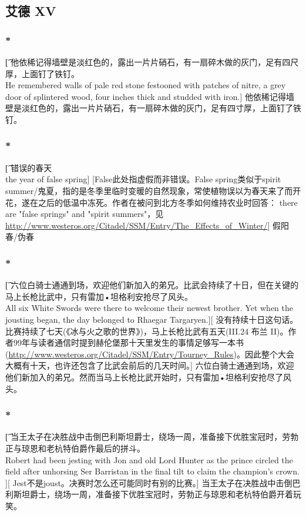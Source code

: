 \documentclass[12pt,a4paper]{article}
\begin{document}
\subsection{艾德 XV}
\subsubsection{\color{red}*}\t[	
	他依稀记得墙壁是淡红色的，露出一片片硝石，有一扇碎木做的灰门，足有四尺厚，上面钉了铁钉。\\
	He remembered walls of pale red stone festooned with patches of nitre, a grey door of splintered wood, four inches thick and studded with iron.]
	他依稀记得墙壁是淡红色的，露出一片片硝石，有一扇碎木做的灰门，足有四寸厚，上面钉了铁钉。

\subsubsection{\color{red}*}\label{1.58.2}\t[		
错误的春天\\		
the year of false spring]		
[False此处指虚假而非错误。False spring类似于spirit summer/鬼夏，指的是冬季里临时变暖的自然现象，常使植物误以为春天来了而开花，遂在之后的低温中冻死。作者在被问到北方冬季如何维持农业时回答： there are "false springs" and "spirit summers"，见\url{http://www.westeros.org/Citadel/SSM/Entry/The_Effects_of_Winter/}]		
假阳春/伪春
	
\subsubsection{\color{red}*}\t[	
	六位白骑士通通到场，欢迎他们新加入的弟兄。比武会持续了十日，但在关键的马上长枪比武中，只有雷加•坦格利安抢尽了风头。\\
	All six White Swords were there to welcome their newest brother. Yet when the jousting began, the day belonged to Rhaegar Targaryen.][
	没有持续十日这句话。比赛持续了七天(《冰与火之歌的世界》)，马上长枪比武有五天(III.24 布兰 II)。作者99年与读者通信时提到赫伦堡那十天里发生的事情足够写一本书(\url{http://www.westeros.org/Citadel/SSM/Entry/Tourney_Rules})。因此整个大会大概有十天，也许还包含了比武会前后的几天时间。]
	六位白骑士通通到场，欢迎他们新加入的弟兄。然而当马上长枪比武开始时，只有雷加•坦格利安抢尽了风头。
	
\subsubsection{\color{red}*}\t[	
	当王太子在决胜战中击倒巴利斯坦爵士，绕场一周，准备接下优胜宝冠时，劳勃正与琼恩和老杭特伯爵作最后的拼斗。\\
	Robert had been jesting with Jon and old Lord Hunter as the prince circled the field after unhorsing Ser Barristan in the final tilt to claim the champion's crown. ][
	Jest不是joust。决赛时怎么还可能同时有别的比赛。]
	当王太子在决胜战中击倒巴利斯坦爵士，绕场一周，准备接下优胜宝冠时，劳勃正与琼恩和老杭特伯爵开着玩笑。
	
\end{document}

